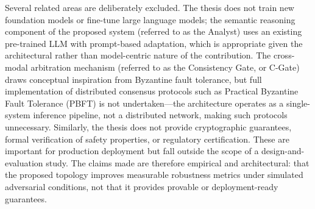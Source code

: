 Several related areas are deliberately excluded. The thesis does not train new foundation models or fine-tune large language models; the semantic reasoning component of the proposed system (referred to as the Analyst) uses an existing pre-trained LLM with prompt-based adaptation, which is appropriate given the architectural rather than model-centric nature of the contribution. The cross-modal arbitration mechanism (referred to as the Consistency Gate, or C-Gate) draws conceptual inspiration from Byzantine fault tolerance, but full implementation of distributed consensus protocols such as Practical Byzantine Fault Tolerance (PBFT) \cite{castro1999pbft} is not undertaken---the architecture operates as a single-system inference pipeline, not a distributed network, making such protocols unnecessary. Similarly, the thesis does not provide cryptographic guarantees, formal verification of safety properties, or regulatory certification. These are important for production deployment but fall outside the scope of a design-and-evaluation study. The claims made are therefore empirical and architectural: that the proposed topology improves measurable robustness metrics under simulated adversarial conditions, not that it provides provable or deployment-ready guarantees.
